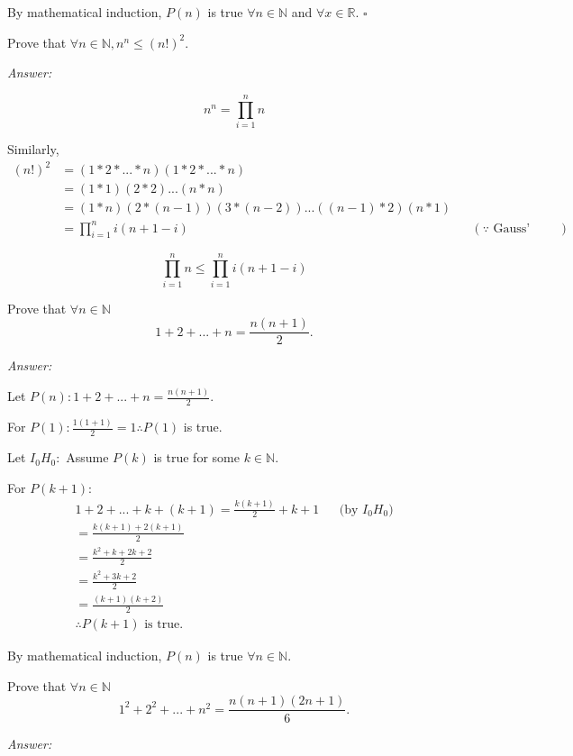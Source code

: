 \documentclass[12pt]{article}
\newenvironment{problem}[2][Problem]{\begin{trivlist}
\item[\hskip \labelsep {\bfseries #1}\hskip \labelsep {\bfseries #2.}]}{\end{trivlist}}
\begin{document}
By mathematical induction, $P(n)$ is true $\forall n \in \mathbb{N}$ and $\forall x \in \mathbb{R}.$
$\square$

\begin{problem}{8}
Prove that $\forall n \in \mathbb{N}, n^n \leq (n!)^2$.
\end{problem}

\textit{Answer:}

$$
n^n = \prod_{i=1}^{n} n 
$$

Similarly, 
\begin{align*}
(n!)^2 &= (1*2*...*n)(1*2*...*n)\\
&=(1*1)(2*2)...(n*n)\\
&=(1*n)(2*(n-1))(3*(n-2))...((n-1)*2)(n*1)\\
&=\prod_{i=1}^{n} i(n+1-i) && (\because \text{ Gauss' Trick})
\end{align*}

$$
\prod_{i=1}^{n} n \leq \prod_{i=1}^{n} i(n+1-i)
$$

\begin{problem}{9}
Prove that $\forall n \in \mathbb{N}$ 
$$
1 + 2 + ... + n = \frac{n(n+1)}{2}.
$$
\end{problem}

\textit{Answer:}

Let $P(n): 1 + 2 + ... + n = \frac{n(n+1)}{2}$.

For $P(1): \frac{1(1+1)}{2} = 1 \therefore P(1)$ is true.

Let $I_0H_0:$ Assume $P(k)$ is true for some $k \in \mathbb{N}$.

For $P(k+1):$
\begin{align*}
1 + 2 + ... + k + (k+1) = \frac{k(k+1)}{2} + k + 1 && \text{(by $I_0H_0$)} \\
= \frac{k(k+1) + 2(k+1)}{2} \\
= \frac{k^2+k+2k+2}{2} \\
= \frac{k^2+3k+2}{2} \\
= \frac{(k+1)(k+2)}{2} \\
\therefore P(k+1) \text{ is true.}
\end{align*}

By mathematical induction, $P(n)$ is true $\forall n \in \mathbb{N}$.


\begin{problem}{10}
Prove that $\forall n \in \mathbb{N}$ 
$$
1^2 + 2^2 + ... + n^2 = \frac{n(n+1)(2n+1)}{6}.
$$
\end{problem}

\textit{Answer:}
\end{document}
